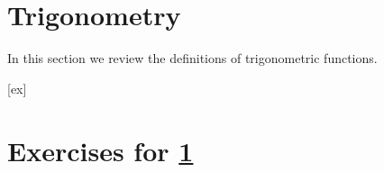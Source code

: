 \newpage 
\section{Trigonometry}\label{sec:Trigonometry}
In this section we review the definitions of trigonometric functions.








[ex]
\section*{Exercises for \ref{sec:Trigonometry}}

